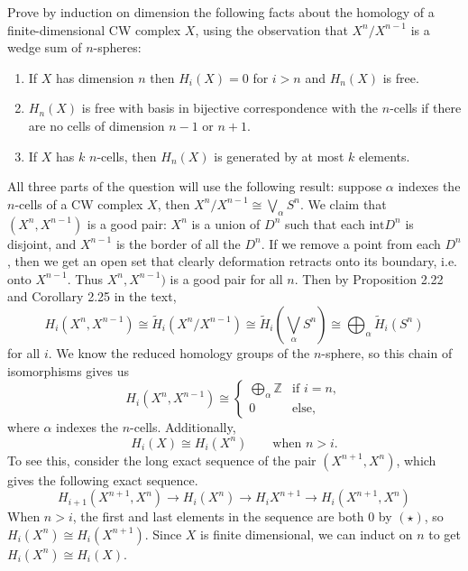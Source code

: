 \documentclass[twoside,10pt]{article}
\begin{document}
\newpage

\begin{exer}[2.1: 22]
	Prove by induction on dimension the following facts about the homology of a finite-dimensional CW complex $X$, using the observation that $X^{n}/X^{n-1}$ is a wedge sum of $n$-spheres:
	\begin{enumerate}
		\item If $X$ has dimension $n$ then $H_{i}(X)=0$ for $i>n$ and $H_{n}(X)$ is free.
		\item $H_{n}(X)$ is free with basis in bijective correspondence with the $n$-cells if there are no cells of dimension $n-1$ or $n+1$.
		\item If $X$ has $k$ $n$-cells, then $H_{n}(X)$ is generated by at most $k$ elements.
	\end{enumerate}
\end{exer}

All three parts of the question will use the following result: suppose $\alpha$ indexes the $n$-cells of a CW complex $X$, then $X^{n}/X^{n-1} \cong \bigvee_{\alpha}S^{n}$. We claim that $(X^{n},X^{n-1})$ is a good pair: $X^{n}$ is a union of $D^{n}$ such that each $\text{int} D^{n}$ is disjoint, and $X^{n-1}$ is the border of all the $D^{n}$. If we remove a point from each $D^{n}$, then we get an open set that clearly deformation retracts onto its boundary, i.e. onto $X^{n-1}$. Thus $X^{n},X^{n-1})$ is a good pair for all $n$. Then by Proposition 2.22 and Corollary 2.25 in the text,
\[
	H_{i}(X^{n}, X^{n-1}) \cong \tilde{H}_{i}(X^{n}/X^{n-1}) \cong \tilde{H}_{i}\left(\bigvee_{\alpha} S^{n}\right) \cong \bigoplus_{\alpha}\tilde{H}_{i}(S^{n})
\] for all $i$. We know the reduced homology groups of the $n$-sphere, so this chain of isomorphisms gives us
\[
	H_{i}(X^{n},X^{n-1}) \cong 
	\begin{cases}
		\bigoplus_{\alpha}\mathbb{Z} & \text{if } i=n,\\
		0 & \text{else},
	\end{cases}
	\tag{$\star$}
\] 
where $\alpha$ indexes the $n$-cells. Additionally,
\[
	H_{i}(X) \cong H_{i}(X^{n}) \qquad \text{when } n>i. \tag{$\star\star$}
\] To see this, consider the long exact sequence of the pair $(X^{n+1},X^{n})$, which gives the following exact sequence.
\[
	H_{i+1}(X^{n+1},X^{n}) \to H_{i}(X^{n}) \to H_{i}X^{n+1} \to H_{i}(X^{n+1},X^{n})
\] When $n > i$, the first and last elements in the sequence are both $0$ by $(\star)$, so $H_{i}(X^{n}) \cong H_{i}(X^{n+1})$. Since $X$ is finite dimensional, we can induct on $n$ to get $H_{i}(X^{n}) \cong H_{i}(X)$.
\end{document}
